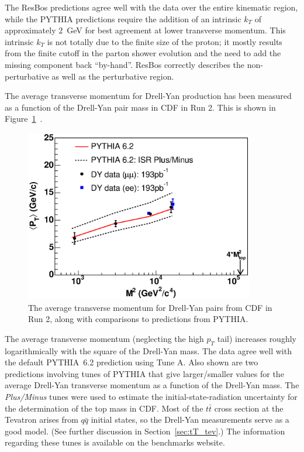 \documentclass[12pt]{iopart}
\begin{document}
%
The ResBos predictions agree well with the data over the entire kinematic region, while the PYTHIA predictions require the addition of
an intrinsic $k_T$ of approximately $2$~GeV for best agreement at  lower transverse momentum. This intrinsic $k_T$ is not totally due
to the finite size of the proton; it mostly results from the finite cutoff in the parton shower evolution and the need to add the
missing component back ``by-hand''. ResBos correctly describes the non-perturbative as well as the perturbative region.

The average transverse momentum for Drell-Yan production has been measured as a function of the Drell-Yan pair mass in CDF in Run 2.
This is shown in Figure~\ref{fig:pt_evol}~\cite{Abulencia:2005aj}.
%
\begin{figure}[t]
\begin{center}
\includegraphics[width=10cm]{pt_evol_gen_corr_v4_prd.eps}
\end{center}
\vspace*{-0.5cm}
\caption{
The average transverse momentum for Drell-Yan pairs from CDF in Run 2, along with comparisons to predictions from PYTHIA.
\label{fig:pt_evol}}
\end{figure}
%
The average transverse momentum (neglecting the high $p_T$ tail) increases roughly logarithmically with the square of the Drell-Yan
mass. The data agree well with the default PYTHIA~6.2 prediction using Tune A.
Also shown are two predictions involving tunes of PYTHIA that give larger/smaller values for the average Drell-Yan transverse momentum
as a function of the Drell-Yan mass. The {\it Plus/Minus} tunes were used to estimate the initial-state-radiation uncertainty for the
determination of the top mass in CDF. Most of the $t\bar{t}$ cross section at the Tevatron arises from $q\bar{q}$ initial states, so the
Drell-Yan measurements serve as a good model. (See further discussion in Section~\ref{sec:tT_tev}.) 
The information regarding these tunes is available on the benchmarks website. 
\end{document}
